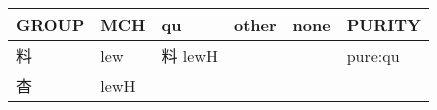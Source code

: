 \documentclass[14pt,a4paper]{scrartcl}
\begin{document}
\begin{longtable}[c]{@{}llllll@{}}
\toprule
\begin{minipage}[b]{0.14\columnwidth}\raggedright\strut
GROUP
\strut\end{minipage} &
\begin{minipage}[b]{0.14\columnwidth}\raggedright\strut
MCH
\strut\end{minipage} &
\begin{minipage}[b]{0.14\columnwidth}\raggedright\strut
qu
\strut\end{minipage} &
\begin{minipage}[b]{0.14\columnwidth}\raggedright\strut
other
\strut\end{minipage} &
\begin{minipage}[b]{0.14\columnwidth}\raggedright\strut
none
\strut\end{minipage} &
\begin{minipage}[b]{0.14\columnwidth}\raggedright\strut
PURITY
\strut\end{minipage}\tabularnewline
\midrule
\endhead
\begin{minipage}[t]{0.14\columnwidth}\raggedright\strut
料
\strut\end{minipage} &
\begin{minipage}[t]{0.14\columnwidth}\raggedright\strut
lew
\strut\end{minipage} &
\begin{minipage}[t]{0.14\columnwidth}\raggedright\strut
料 lewH
\strut\end{minipage} &
\begin{minipage}[t]{0.14\columnwidth}\raggedright\strut
\strut\end{minipage} &
\begin{minipage}[t]{0.14\columnwidth}\raggedright\strut
\strut\end{minipage} &
\begin{minipage}[t]{0.14\columnwidth}\raggedright\strut
pure:qu
\strut\end{minipage}\tabularnewline
\begin{minipage}[t]{0.14\columnwidth}\raggedright\strut
杳
\strut\end{minipage} &
\begin{minipage}[t]{0.14\columnwidth}\raggedright\strut
lewH
\strut\end{minipage} &
\begin{minipage}[t]{0.14\columnwidth}\raggedright\strut
\strut\end{minipage} &
\begin{minipage}[t]{0.14\columnwidth}\raggedright\strut

\end{minipage}
\end{longtable}
\end{document}

